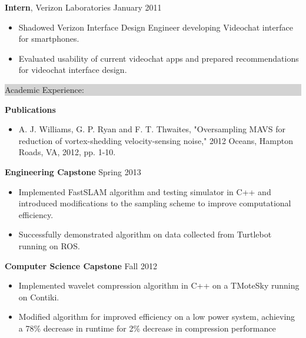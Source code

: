 \documentclass{article} %
\newcommand{\rsection}[1]{
\hspace{-0.4cm}
\colorbox{lightgrey}{
\begin{minipage}{1.07\linewidth}
\vspace{0.25cm}
\fontsize{14pt}{16pt}\selectfont #1 
\vspace{0.15cm}
\end{minipage}
}
\vspace*{-0.2cm}
}
\newcommand{\rjob}[2]{
\vspace{0.1cm}
\hspace*{-0.3cm}  
{\fontsize{10pt}{12pt}\selectfont #1} \hfill #2 
\vspace*{0.1cm} 
\hspace*{-1.2cm}
}
\newenvironment{ritemize}{
\hspace*{-0.8cm} 
\begin{minipage}{1.05\linewidth}
\begin{itemize}
}{
\end{itemize}
\end{minipage}
\vspace{-0.2cm}
}
\newcommand{\ritem}{
\item[-]
}
\begin{document}
\rjob{\textbf{Intern}, Verizon Laboratories}{January 2011}\\
\begin{ritemize}
\ritem Shadowed Verizon Interface Design Engineer developing Videochat interface for smartphones.
\ritem Evaluated usability of current videochat apps and prepared recommendations for videochat interface design.
\end{ritemize}

\rsection{Academic Experience:}

\rjob{\textbf{Publications}}{}\\
\begin{ritemize}
\ritem A. J. Williams, G. P. Ryan and F. T. Thwaites, "Oversampling MAVS for reduction of vortex-shedding velocity-sensing noise," 2012 Oceans, Hampton Roads, VA, 2012, pp. 1-10.
\end{ritemize}

\rjob{\textbf{Engineering Capstone}}{Spring 2013}\\
\begin{ritemize}
\ritem Implemented FastSLAM algorithm and testing simulator in C++ and introduced modifications to the sampling scheme to improve computational efficiency.
\ritem Successfully demonstrated algorithm on data collected from Turtlebot running on ROS.
\end{ritemize}

\rjob{\textbf{Computer Science Capstone}}{Fall 2012}\\
\begin{ritemize}
\ritem Implemented wavelet compression algorithm in C++ on a TMoteSky running on Contiki. 
\ritem Modified algorithm for improved efficiency on a low power system, achieving a 78\% decrease in runtime for 2\% decrease in compression performance
\end{ritemize}

\end{document}
